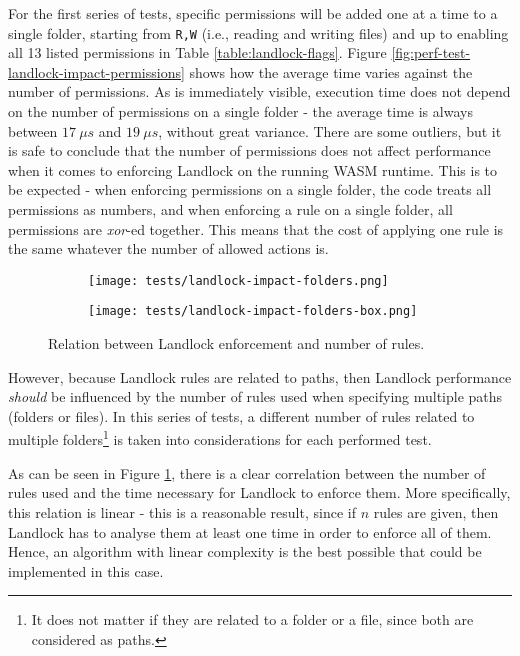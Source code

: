 For the first series of tests, specific permissions will be added one at a time to a single folder,
starting from \texttt{R,W} (i.e., reading and writing files) and up to enabling all 13 listed permissions
in Table \ref{table:landlock-flags}.
Figure \ref{fig:perf-test-landlock-impact-permissions} shows how the average time varies against the number of permissions.
As is immediately visible, execution time does not depend on the number of permissions on a single folder -
the average time is always between $17\ \mu s$ and $19\ \mu s$, without great variance.
There are some outliers, but it is safe to conclude that the number of permissions does not affect performance
when it comes to enforcing Landlock on the running WASM runtime.
This is to be expected - when enforcing permissions on a single folder, the code treats all permissions as numbers,
and when enforcing a rule on a single folder, all permissions are \textit{xor}-ed together.
This means that the cost of applying one rule is the same whatever the number of allowed actions is.

\begin{figure}[hbt!]
  \centering
  \begin{subfigure}[b]{0.49\textwidth}
    \texttt{[image: tests/landlock-impact-folders.png]}
  \end{subfigure}
  \begin{subfigure}[b]{0.49\textwidth}
    \texttt{[image: tests/landlock-impact-folders-box.png]}
  \end{subfigure}

  \caption{Relation between Landlock enforcement and number of rules.}
  \label{fig:perf-test-landlock-impact-folders}
\end{figure}

However, because Landlock rules are related to paths, then Landlock performance \textit{should} be influenced by the
number of rules used when specifying multiple paths (folders or files).
In this series of tests, a different number of rules related to multiple folders\footnote{It does not matter if they are
related to a folder or a file, since both are considered as paths.} is taken into considerations
for each performed test.

As can be seen in Figure \ref{fig:perf-test-landlock-impact-folders}, there is a clear correlation
between the number of rules used and the time necessary for Landlock to enforce them.
More specifically, this relation is linear - this is a reasonable result, since if $n$ rules are given,
then Landlock has to analyse them at least one time in order to enforce all of them.
Hence, an algorithm with linear complexity is the best possible that could be implemented
in this case.


